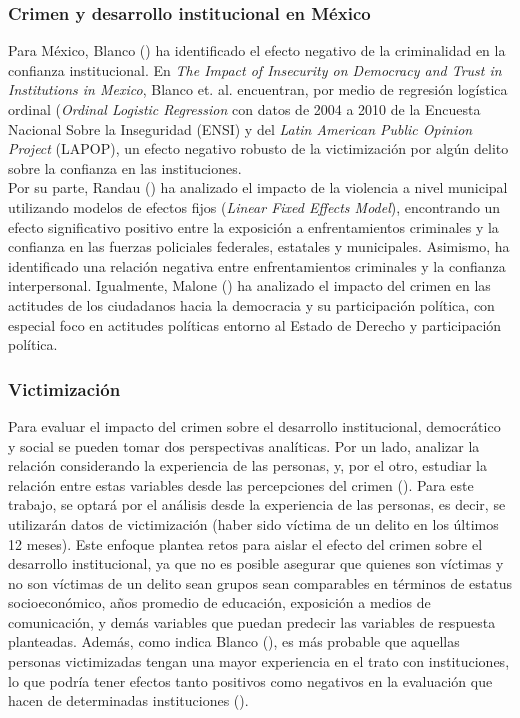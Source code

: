 \documentclass[letterpaper]{article}
\begin{document}
\subsubsection{Crimen y desarrollo institucional en México}

Para México, Blanco (\citeyear{blanco2012, blanco2013b}) ha identificado el efecto negativo de  la criminalidad en la confianza institucional. En \emph {The Impact of Insecurity on Democracy and Trust in Institutions in Mexico}, Blanco et. al. encuentran, por medio de regresión logística ordinal (\emph{Ordinal Logistic Regression} con datos de 2004 a 2010 de la Encuesta Nacional Sobre la Inseguridad (ENSI) y del \emph{Latin American Public Opinion Project} (LAPOP), un efecto negativo robusto de la victimización por algún delito sobre la confianza en las instituciones.\\[-1.5em] 

Por su parte, Randau (\citeyear{randau2022}) ha analizado el impacto de la violencia a nivel municipal utilizando modelos de efectos fijos (\emph{Linear Fixed Effects Model}), encontrando un efecto significativo positivo entre la exposición a enfrentamientos criminales y la confianza en las fuerzas policiales federales, estatales y municipales. Asimismo, ha identificado una relación negativa entre enfrentamientos criminales y la confianza interpersonal. Igualmente, Malone (\citeyear{malone2010}) ha analizado el impacto del crimen en las actitudes de los ciudadanos hacia la democracia y su participación política, con especial foco en actitudes políticas entorno al Estado de Derecho y participación política.

\subsubsection{Victimización}

Para evaluar el impacto del crimen sobre el desarrollo institucional, democrático y social se pueden tomar dos perspectivas analíticas. Por un lado,  analizar la relación considerando la experiencia de las personas, y, por el otro, estudiar la relación entre estas variables desde las percepciones del crimen (\citeyear{malone2014}). Para este trabajo, se optará por el análisis desde la experiencia de las personas, es decir, se utilizarán datos de victimización (haber sido víctima de un delito en los últimos 12 meses). Este enfoque plantea retos para aislar el efecto del crimen sobre el desarrollo institucional, ya que no es posible asegurar que quienes son víctimas y no son víctimas de un delito sean grupos sean comparables en términos de estatus socioeconómico, años promedio de educación, exposición a medios de comunicación, y demás variables que puedan predecir las variables de respuesta planteadas. Además, como indica Blanco (\citeyear{blanco2012}), es más probable que aquellas personas victimizadas tengan una mayor experiencia en el trato con instituciones, lo que podría tener efectos tanto positivos como negativos en la evaluación que hacen de determinadas instituciones (\citeyear{blanco2012}).
\end{document}
